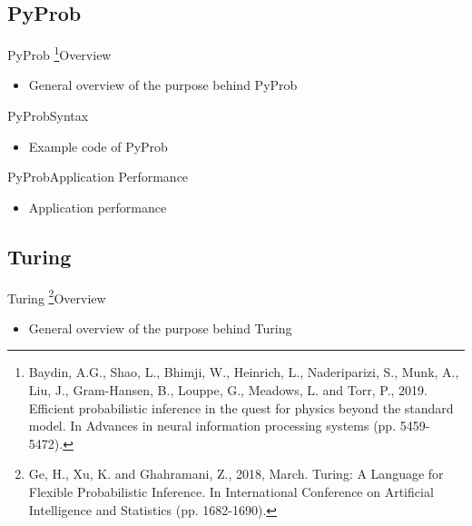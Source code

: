 \documentclass[AERbeamer%
              ,optEnglish%
              ,optBiber%
              ,optBibstyleAlphabetic%
              ,optBeamerClassicFormat%
              ]{AERlatex}%
\begin{document}
\subsection{PyProb}
\begin{frame}[c]{PyProb \footnote{Baydin, A.G., Shao, L., Bhimji, W., Heinrich, L., Naderiparizi, S., Munk, A., Liu, J., Gram-Hansen, B.,
                                  Louppe, G., Meadows, L. and Torr, P., 2019. Efficient probabilistic inference in the quest for physics
                                  beyond the standard model. In Advances in neural information processing systems (pp. 5459-5472).}}{Overview}
    \centering
    \begin{itemize}
        \item General overview of the purpose behind PyProb
    \end{itemize}
\end{frame}


\begin{frame}[c]{PyProb}{Syntax}
    \centering
    \begin{itemize}
        \item Example code of PyProb
    \end{itemize}
\end{frame}


\begin{frame}[c]{PyProb}{Application Performance}
    \centering
    \begin{itemize}
        \item Application performance
    \end{itemize}
\end{frame}


\subsection{Turing}
\begin{frame}[c]{Turing \footnote{Ge, H., Xu, K. and Ghahramani, Z., 2018, March. Turing: A Language for Flexible
                                  Probabilistic Inference. In International Conference on Artificial Intelligence
                                  and Statistics (pp. 1682-1690).}}{Overview}
    \centering
    \begin{itemize}
        \item General overview of the purpose behind Turing
    \end{itemize}
\end{frame}
\end{document}
